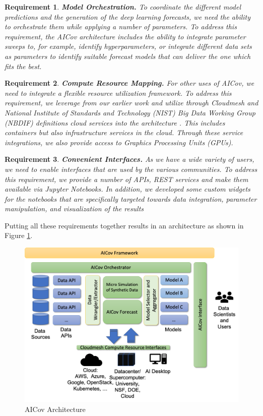 \documentclass[letterpaper, inpress]{jds} %
\renewcommand{\_}{%
    \textunderscore\hspace{0pt}%
}
\newtheorem{requirement}{Requirement}
\begin{document}
\begin{requirement}{\bf Model Orchestration.} \normalfont
  To coordinate the different model predictions and the generation of
  the deep learning forecasts, we need the ability to orchestrate them
  while applying a number of parameters. \Solution To address this
  requirement, the AICov architecture includes the ability to
  integrate parameter sweeps to, for example, identify
  hyperparameters, or integrate different data sets as parameters to
  identify suitable forecast models that can deliver the one which
  fits the best.
\end{requirement}

\begin{requirement}{\bf Compute Resource Mapping.} \normalfont
  For other uses of AICov, we need to integrate a flexible resource
  utilization framework. \Solution To address this requirement, we
  leverage from our earlier work and utilize through Cloudmesh and
  National Institute of Standards and Technology (NIST) Big Data
  Working Group (NBDIF) definitions cloud services into the
  architecture \citep{las-19-nist}. This includes containers but also
  infrastructure services in the cloud. Through these service
  integrations, we also provide access to Graphics Processing Units
  (GPUs).
\end{requirement}

\begin{requirement}{\bf Convenient Interfaces.} \normalfont
  As we have a wide variety of users, we need to enable interfaces
  that are used by the various communities. \Solution To address this
  requirement, we provide a number of APIs, REST services and make
  them available via Jupyter Notebooks. In addition, we developed some
  custom widgets for the notebooks that are specifically targeted
  towards data integration, parameter manipulation, and visualization
  of the results
\end{requirement}


Putting all these requirements together results in an architecture as
shown in Figure \ref{fig:arch}.\\

\begin{figure}[h!]
    \centering
    \includegraphics[width=0.6\columnwidth]{images/arch.pdf}
    \caption{AICov Architecture}
    \label{fig:arch}
\end{figure}
\end{document}

